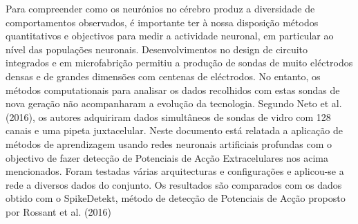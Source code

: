 \begin{resumo}
Para compreender como os neurónios no cérebro produz a diversidade de comportamentos observados, é importante ter à nossa disposição métodos quantitativos e objectivos para medir a actividade neuronal, em particular ao nível das populações neuronais. Desenvolvimentos no design de circuito integrados e em microfabrição permitiu a produção de sondas de muito eléctrodos densas e de grandes dimensões com centenas de eléctrodos. No entanto, os métodos computationais para analisar os dados recolhidos com estas sondas de nova geração não acompanharam a evolução da tecnologia. Segundo Neto et al. (2016), os autores adquiriram dados simultâneos de sondas de vidro com 128 canais e uma pipeta juxtacelular. Neste documento está relatada a aplicação de métodos de aprendizagem usando redes neuronais artificiais profundas com o objectivo de fazer detecção de Potenciais de Acção Extracelulares nos acima mencionados. Foram testadas várias arquitecturas e configurações e aplicou-se a rede a diversos dados do conjunto. Os resultados são comparados com os dados obtido com o SpikeDetekt, método de detecção de Potenciais de Acção proposto por Rossant et al. (2016)
\end{resumo}

